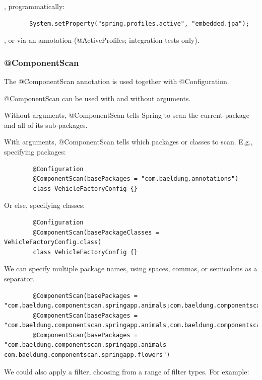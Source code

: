 \documentclass{scrartcl}
\begin{document}
   , programmatically:

   \begin{lstlisting}
       System.setProperty("spring.profiles.active", "embedded.jpa");
   \end{lstlisting}

   , or via an annotation (@ActiveProfiles; integration tests only).


\subsubsection{@ComponentScan}

    The @ComponentScan annotation is used together with @Configuration.

    @ComponentScan can be used with and without arguments.

    Without arguments, @ComponentScan  tells Spring to scan the current package and all of its sub-packages.

    With arguments, @ComponentScan tells which packages or classes to scan. E.g., specifying packages:

    \begin{lstlisting}
        @Configuration
        @ComponentScan(basePackages = "com.baeldung.annotations")
        class VehicleFactoryConfig {}
    \end{lstlisting}

    Or else, specifying classes:

    \begin{lstlisting}
        @Configuration
        @ComponentScan(basePackageClasses = VehicleFactoryConfig.class)
        class VehicleFactoryConfig {}
    \end{lstlisting}

    We can specify multiple package names, using spaces, commas, or semicolons as a separator.

    \begin{lstlisting}
        @ComponentScan(basePackages = "com.baeldung.componentscan.springapp.animals;com.baeldung.componentscan.springapp.flowers")
        @ComponentScan(basePackages = "com.baeldung.componentscan.springapp.animals,com.baeldung.componentscan.springapp.flowers")
        @ComponentScan(basePackages = "com.baeldung.componentscan.springapp.animals com.baeldung.componentscan.springapp.flowers")
    \end{lstlisting}

    We could also apply a filter, choosing from a range of filter types. For example:
\end{document}
